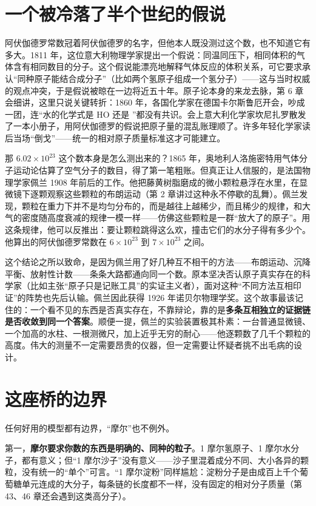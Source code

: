 \section{一个被冷落了半个世纪的假说}

\begin{zhengju}
阿伏伽德罗常数冠着阿伏伽德罗的名字，但他本人既没测过这个数，也不知道它有多大。1811 年，这位意大利物理学家提出一个假说：同温同压下，相同体积的气体含有相同数目的分子。这个假说能漂亮地解释气体反应的体积关系，可它要求承认“同种原子能结合成分子”（比如两个氢原子组成一个氢分子）——这与当时权威的观点冲突，于是假说被晾在一边将近五十年。原子论本身的来龙去脉，第 6 章会细讲，这里只说关键转折：1860 年，各国化学家在德国卡尔斯鲁厄开会，吵成一团，连“水的化学式是 HO 还是 ”都没有共识。会上意大利化学家坎尼扎罗散发了一本小册子，用阿伏伽德罗的假说把原子量的混乱账理顺了。许多年轻化学家读后当场“倒戈”——统一的相对原子质量标准这才可能建立。

那 $6.02\times 10^{23}$ 这个数本身是怎么测出来的？1865 年，奥地利人洛施密特用气体分子运动论估算了空气分子的数目，得了第一笔粗账。但真正让人信服的，是法国物理学家佩兰 1908 年前后的工作。他把藤黄树脂磨成的微小颗粒悬浮在水里，在显微镜下逐颗观察这些颗粒的布朗运动（第 2 章讲过这种永不停歇的乱舞）。佩兰发现，颗粒在重力下并不是均匀分布的，而是越往上越稀少，而且稀少的规律，和大气的密度随高度衰减的规律一模一样——仿佛这些颗粒是一群“放大了的原子”。用这条规律，他可以反推出：要让颗粒跳得这么欢，撞击它们的水分子得有多少个。他算出的阿伏伽德罗常数在 $6\times 10^{23}$ 到 $7\times 10^{23}$ 之间。

这个结论之所以致命，是因为佩兰用了好几种互不相干的方法——布朗运动、沉降平衡、放射性计数——条条大路都通向同一个数。原本坚决否认原子真实存在的科学家（比如主张“原子只是记账工具”的实证主义者），面对这种“不同方法互相印证”的阵势也先后认输。佩兰因此获得 1926 年诺贝尔物理学奖。这个故事最该记住的：一个看不见的东西是否真实存在，不靠辩论，靠的是\textbf{多条互相独立的证据链是否收敛到同一个答案}。顺便一提，佩兰的实验装置极其朴素：一台普通显微镜、一个加高的水柱、一根测微尺，加上近乎无穷的耐心——他逐颗数了几千个颗粒的高度。伟大的测量不一定需要昂贵的仪器，但一定需要让怀疑者挑不出毛病的设计。
\end{zhengju}

\section{这座桥的边界}

任何好用的模型都有边界，“摩尔”也不例外。

第一，\textbf{摩尔要求你数的东西是明确的、同种的粒子}。1 摩尔氢原子、1 摩尔水分子，都有意义；但“1 摩尔沙子”没有意义——沙子里混着成分不同、大小各异的颗粒，没有统一的“单个”可言。“1 摩尔淀粉”同样尴尬：淀粉分子是由成百上千个葡萄糖单元连成的大分子，每条链的长度都不一样，没有固定的相对分子质量（第 43、46 章还会遇到这类高分子）。

